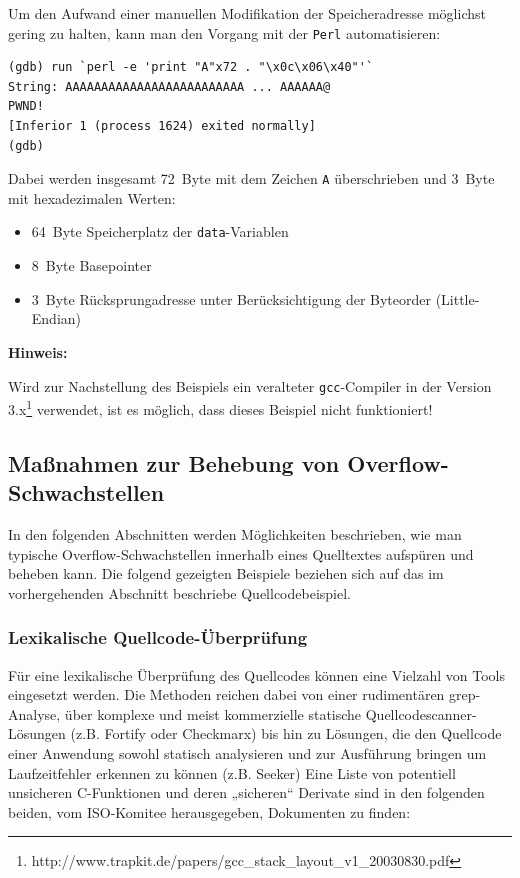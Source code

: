 Um den Aufwand einer manuellen Modifikation der Speicheradresse möglichst gering zu halten, kann man den Vorgang mit der \texttt{Perl} automatisieren:

\begin{lstlisting}[basicstyle=\ttfamily\footnotesize]
(gdb) run `perl -e 'print "A"x72 . "\x0c\x06\x40"'`
String: AAAAAAAAAAAAAAAAAAAAAAAAA ... AAAAAA@
PWND!
[Inferior 1 (process 1624) exited normally]
(gdb)
\end{lstlisting}

Dabei werden insgesamt \SI{72}{Byte} mit dem Zeichen \texttt{A} überschrieben und \SI{3}{Byte} mit hexadezimalen Werten:

\begin{itemize}
      \item \SI{64}{Byte} Speicherplatz der \texttt{data}-Variablen    
      \item \SI{8}{Byte} Basepointer
      \item \SI{3}{Byte} Rücksprungadresse unter Berücksichtigung der Byteorder (Little-Endian)
\end{itemize}

\textbf{Hinweis:}

Wird zur Nachstellung des Beispiels ein veralteter \texttt{gcc}-Compiler in der Version 3.x\footnote{http://www.trapkit.de/papers/gcc\_stack\_layout\_v1\_20030830.pdf} verwendet, ist es möglich, dass dieses Beispiel nicht funktioniert!

\subsection{Maßnahmen zur Behebung von Overflow-Schwachstellen}

In den folgenden Abschnitten werden Möglichkeiten beschrieben, wie man typische Overflow-Schwachstellen innerhalb eines Quelltextes aufspüren und beheben kann. Die folgend gezeigten Beispiele beziehen sich auf das im vorhergehenden Abschnitt beschriebe Quellcodebeispiel.

\subsubsection{Lexikalische Quellcode-Überprüfung}

Für eine lexikalische Überprüfung des Quellcodes können eine Vielzahl von Tools eingesetzt werden. Die Methoden reichen dabei von einer rudimentären grep-Analyse, über komplexe und meist kommerzielle statische Quellcodescanner-Lösungen (z.B. Fortify oder Checkmarx) bis hin zu Lösungen, die den Quellcode einer Anwendung sowohl statisch analysieren und zur Ausführung bringen um Laufzeitfehler erkennen zu können (z.B. Seeker)
Eine Liste von potentiell unsicheren C-Funktionen und deren „sicheren“ Derivate sind in den folgenden beiden, vom ISO-Komitee herausgegeben, Dokumenten zu finden:

